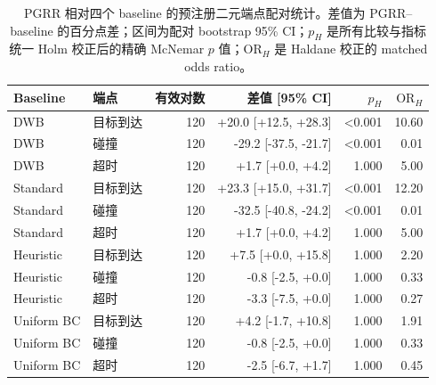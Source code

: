\begin{table}[htbp]
\centering
\scriptsize
\caption{PGRR 相对四个 baseline 的预注册二元端点配对统计。差值为 PGRR--baseline 的百分点差；区间为配对 bootstrap 95\% CI；$p_H$ 是所有比较与指标统一 Holm 校正后的精确 McNemar $p$ 值；$\mathrm{OR}_H$ 是 Haldane 校正的 matched odds ratio。}
\begin{tabular}{llrrrr}
\toprule
Baseline & 端点 & 有效对数 & 差值 [95\% CI] & $p_H$ & $\mathrm{OR}_H$ \\
\midrule
DWB & 目标到达 & 120 & +20.0 [+12.5, +28.3] & <0.001 & 10.60 \\
DWB & 碰撞 & 120 & -29.2 [-37.5, -21.7] & <0.001 & 0.01 \\
DWB & 超时 & 120 & +1.7 [+0.0, +4.2] & 1.000 & 5.00 \\
\addlinespace
Standard & 目标到达 & 120 & +23.3 [+15.0, +31.7] & <0.001 & 12.20 \\
Standard & 碰撞 & 120 & -32.5 [-40.8, -24.2] & <0.001 & 0.01 \\
Standard & 超时 & 120 & +1.7 [+0.0, +4.2] & 1.000 & 5.00 \\
\addlinespace
Heuristic & 目标到达 & 120 & +7.5 [+0.0, +15.8] & 1.000 & 2.20 \\
Heuristic & 碰撞 & 120 & -0.8 [-2.5, +0.0] & 1.000 & 0.33 \\
Heuristic & 超时 & 120 & -3.3 [-7.5, +0.0] & 1.000 & 0.27 \\
\addlinespace
Uniform BC & 目标到达 & 120 & +4.2 [-1.7, +10.8] & 1.000 & 1.91 \\
Uniform BC & 碰撞 & 120 & -0.8 [-2.5, +0.0] & 1.000 & 0.33 \\
Uniform BC & 超时 & 120 & -2.5 [-6.7, +1.7] & 1.000 & 0.45 \\
\bottomrule
\end{tabular}
\end{table}
